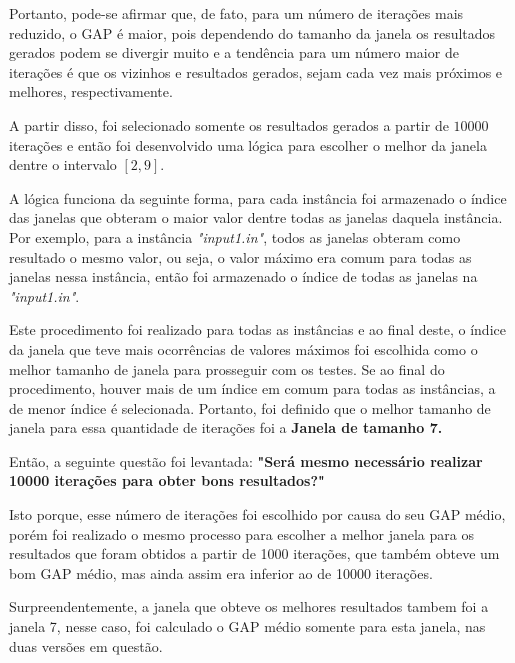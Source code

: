 \documentclass[a4paper, 12pt]{article}
\begin{document}
Portanto, pode-se afirmar que, de fato, para um número de iterações mais reduzido, o GAP é maior, pois
dependendo do tamanho da janela os resultados gerados podem se divergir muito e a tendência para um número
maior de iterações é que os vizinhos e resultados gerados, sejam cada vez mais próximos e melhores,
respectivamente.

A partir disso, foi selecionado somente os resultados gerados a partir de $10000$ iterações
e então foi desenvolvido uma lógica para escolher o melhor da janela dentre o intervalo $[2,9]$.

A lógica funciona da seguinte forma, para cada instância foi armazenado o índice das janelas que obteram
o maior valor dentre todas as janelas daquela instância. Por exemplo, para a instância \textit{"input1.in"},
todos as janelas obteram como resultado o mesmo valor, ou seja, o valor máximo era comum para todas as janelas
nessa instância, então foi armazenado o índice de todas as janelas na \textit{"input1.in"}.

Este procedimento foi realizado para todas as instâncias e ao final deste, o índice da janela que teve 
mais ocorrências de valores máximos foi escolhida como o melhor tamanho de janela para prosseguir com os testes. Se
ao final do procedimento, houver mais de um índice em comum para todas as instâncias, a de menor índice é selecionada.
Portanto, foi definido que o melhor tamanho de janela para essa quantidade de iterações foi a \textbf{Janela de tamanho 7.}

Então, a seguinte questão foi levantada: \textbf{"Será mesmo necessário realizar 10000 iterações para obter bons resultados?"}

Isto porque, esse número de iterações foi escolhido por causa do seu GAP médio, porém foi realizado o 
mesmo processo para escolher a melhor janela para os resultados que foram obtidos a partir de 1000 iterações,
que também obteve um bom GAP médio, mas ainda assim era inferior ao de 10000 iterações.

Surpreendentemente, a janela que obteve os melhores resultados tambem foi a janela 7, nesse caso, foi calculado
o GAP médio somente para esta janela, nas duas versões em questão.

\begin{table}[htbp]
    \centering
\end{table}
\end{document}
